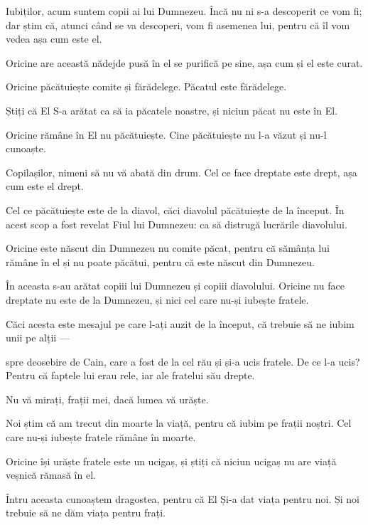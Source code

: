 {Iubiților, acum suntem copii ai lui Dumnezeu. Încă nu ni s-a descoperit ce vom fi; dar știm că, atunci când se va descoperi, vom fi asemenea lui, pentru că îl vom vedea așa cum este el.

Oricine are această nădejde pusă în el se purifică pe sine, așa cum și el este curat.


\par }{\PP {}Oricine păcătuiește comite și fărădelege. Păcatul este fărădelege.

Știți că El S-a arătat ca să ia păcatele noastre, și niciun păcat nu este în El.

Oricine rămâne în El nu păcătuiește. Cine păcătuiește nu l-a văzut și nu-l cunoaște.


\par }{\PP {}Copilașilor, nimeni să nu vă abată din drum. Cel ce face dreptate este drept, așa cum este el drept.

Cel ce păcătuiește este de la diavol, căci diavolul păcătuiește de la început. În acest scop a fost revelat Fiul lui Dumnezeu: ca să distrugă lucrările diavolului.

Oricine este născut din Dumnezeu nu comite păcat, pentru că sămânța lui rămâne în el și nu poate păcătui, pentru că este născut din Dumnezeu.

În aceasta s-au arătat copiii lui Dumnezeu și copiii diavolului. Oricine nu face dreptate nu este de la Dumnezeu, și nici cel care nu-și iubește fratele.

Căci acesta este mesajul pe care l-ați auzit de la început, că trebuie să ne iubim unii pe alții —

spre deosebire de Cain, care a fost de la cel rău și și-a ucis fratele. De ce l-a ucis? Pentru că faptele lui erau rele, iar ale fratelui său drepte.


\par }{\PP {}Nu vă mirați, frații mei, dacă lumea vă urăște.

Noi știm că am trecut din moarte la viață, pentru că iubim pe frații noștri. Cel care nu-și iubește fratele rămâne în moarte.

Oricine își urăște fratele este un ucigaș, și știți că niciun ucigaș nu are viață veșnică rămasă în el.


\par }{\PP {}Întru aceasta cunoaștem dragostea, pentru că El Și-a dat viața pentru noi. Și noi trebuie să ne dăm viața pentru frați.

}
